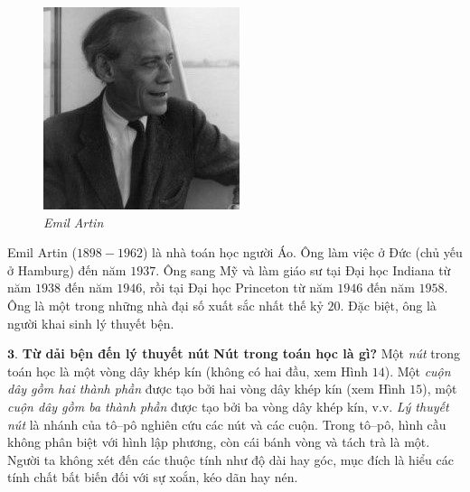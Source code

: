 \begin{multicols}{2}
\begin{tBox}
\begin{figure}
			\hspace*{3pt}\includegraphics[width= 1.1\linewidth]{fig_Artin}
			\hspace*{3pt}\caption{\small\textit{\color{duongvaotoanhoc}Emil Artin}}
			\vspace*{-15pt}
		\end{figure}
		Emil Artin ($1898-1962$) là nhà toán học người Áo. Ông làm việc ở Đức (chủ yếu ở Hamburg) đến năm $1937$. Ông sang Mỹ và làm giáo sư tại Đại học Indiana từ năm $1938$ đến năm $1946$, rồi tại Đại học Princeton từ năm $1946$ đến năm $1958$. Ông là một trong những nhà đại số xuất sắc nhất thế kỷ $20$. Đặc biệt, ông là người khai sinh lý thuyết bện.
	\end{tBox}
	$\pmb{3.}$ \textbf{\color{duongvaotoanhoc}Từ dải bện đến lý thuyết nút}
	\vskip 0.1cm
	\textbf{\color{duongvaotoanhoc}Nút trong toán học là gì?}
	\vskip 0.1cm
	Một \textit{nút} trong toán học là một vòng dây khép kín (không có hai đầu, xem Hình $14$). Một \textit{cuộn dây gồm hai thành phần} được tạo bởi hai vòng dây khép kín (xem Hình $15$), một \textit{cuộn dây gồm ba thành phần} được tạo bởi ba vòng dây khép kín, v.v. \textit{Lý thuyết nút} là nhánh của tô--pô nghiên cứu các nút và các cuộn. Trong tô--pô, hình cầu không phân biệt với hình lập phương, còn cái bánh vòng và tách trà là một. Người ta không xét đến các thuộc tính như độ dài hay góc, mục đích là hiểu các tính chất bất biến đối với sự xoắn, kéo dãn hay nén.

\end{multicols}
